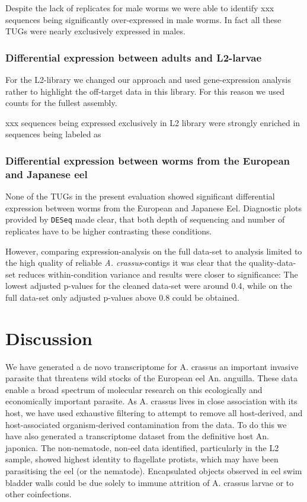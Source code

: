 \documentclass[10pt]{bmc_article}
\newenvironment{bmcformat}{\begin{raggedright}\baselineskip20pt\sloppy\setboolean{publ}{false}}{\end{raggedright}\baselineskip20pt\sloppy}
\begin{document}
\begin{bmcformat}
Despite the lack of replicates for male worms we were able to identify
xxx sequences being significantly
over-expressed in male worms. In fact all these TUGs were nearly
exclusively expressed in males. 

\subsubsection*{Differential expression between adults and L2-larvae}

For the L2-library we changed our approach and used gene-expression
analysis rather to highlight the off-target data in this library. For
this reason we used counts for the fullest assembly.

xxx sequences being expressed exclusively
in L2 library were strongly enriched in sequences being labeled as

\subsubsection*{Differential expression between worms from the European
  and Japanese eel}

None of the TUGs in the present evaluation showed significant
differential expression between worms from the European and Japanese
Eel. Diagnostic plots provided by \texttt{DESeq} made clear, that both
depth of sequencing and number of replicates have to be higher
contrasting these conditions.

However, comparing expression-analysis on the full data-set to analysis
limited to the high quality of reliable \textit{A. crassus}-contigs it
was clear that the quality-data-set reduces within-condition variance
and results were closer to significance: The lowest adjusted p-values
for the cleaned data-set were around 0.4, while on the full data-set
only adjusted p-values above 0.8 could be obtained.



\section*{Discussion}

We have generated a de novo transcriptome for A. crassus an important
invasive parasite that threatens wild stocks of the European eel
An. anguilla. These data enable a broad spectrum of molecular research
on this ecologically and economically important parasite. As
A. crassus lives in close association with its host, we have used
exhaustive filtering to attempt to remove all host-derived, and
host-associated organism-derived contamination from the data. To do
this we have also generated a transcriptome dataset from the
definitive host An. japonica. The non-nematode, non-eel data
identified, particularly in the L2 sample, showed highest identity to
flagellate protists, which may have been parasitising the eel (or the
nematode). Encapsulated objects observed in eel swim bladder walls
\cite{heitlinger_massive_2009} could be due solely to immune attrition
of A. crassus larvae or to other coinfections.


\end{bmcformat}
\end{document}

